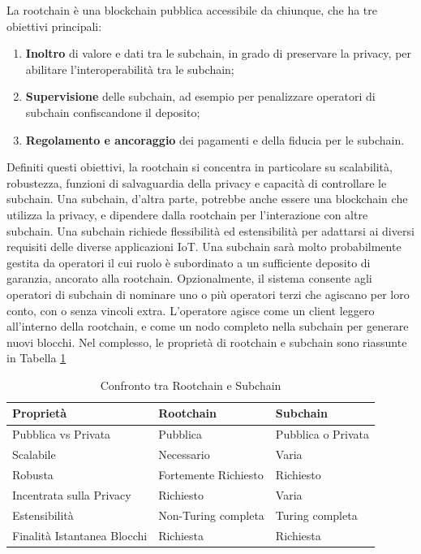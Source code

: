 La rootchain è una blockchain pubblica accessibile da chiunque, che ha tre obiettivi principali:

\begin{enumerate}
	\item
	      \textbf{Inoltro} di valore e dati tra le subchain, in grado di preservare la privacy, per abilitare l'interoperabilità tra le subchain;
	\item
	      \textbf{Supervisione} delle subchain, ad esempio per penalizzare operatori di subchain confiscandone il deposito;
	\item
	      \textbf{Regolamento e ancoraggio} dei pagamenti e della fiducia per le subchain.
\end{enumerate}
Definiti questi obiettivi, la rootchain si concentra in particolare su scalabilità, robustezza, funzioni di salvaguardia della privacy e capacità di controllare le subchain.
Una subchain, d'altra parte, potrebbe anche essere una blockchain che utilizza la privacy, e dipendere dalla rootchain per l'interazione con altre subchain. Una subchain richiede flessibilità ed estensibilità per adattarsi ai diversi requisiti delle diverse applicazioni IoT. Una subchain sarà molto probabilmente gestita da operatori il cui ruolo è subordinato a un sufficiente deposito di garanzia, ancorato alla rootchain. Opzionalmente, il sistema consente agli operatori di subchain di nominare uno o più operatori terzi che agiscano per loro conto, con o senza vincoli extra. L'operatore agisce come un client leggero all'interno della rootchain, e come un nodo completo nella subchain per generare nuovi blocchi.
Nel complesso, le proprietà di rootchain e subchain sono riassunte in Tabella \ref{table:rootchainandsubchains}

\begin{table}[tp]%
	\caption{Confronto tra Rootchain e Subchain}
	\label{table:rootchainandsubchains}\centering %
	\begin{tabular}{l|l|l}
		\hline
		\textbf{Proprietà}          & \textbf{Rootchain}   & \textbf{Subchain}  \\
		\hline
		Pubblica vs Privata         & Pubblica             & Pubblica o Privata \\
		Scalabile                   & Necessario           & Varia              \\
		Robusta                     & Fortemente Richiesto & Richiesto          \\
		Incentrata sulla Privacy    & Richiesto            & Varia              \\
		Estensibilità               & Non-Turing completa  & Turing completa    \\
		Finalità Istantanea Blocchi & Richiesta            & Richiesta          \\
		\hline
	\end{tabular}
\end{table}

